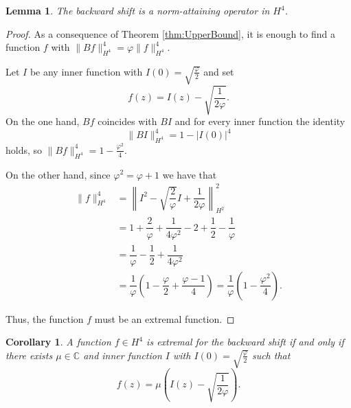 \documentclass{amsart}
\theoremstyle{plain}
\newtheorem{lemma}[theo]{Lemma}
\newtheorem{coro}[theo]{Corollary}
\theoremstyle{definition}
\newcommand{\C}{\mathbb{C}}
\begin{document}
    	\begin{lemma} \label{lem:NormAttaining}
    		The backward shift is a norm-attaining operator in $H^4$.
    	\end{lemma}
    	
    	\begin{proof}
    		As a consequence of Theorem \ref{thm:UpperBound}, it is enough to find a function $f$ with $\| Bf \|_{H^4}^4 = \varphi \| f \|_{H^4}^4$.
    		
    		Let $I$ be any inner function with $I(0) = \sqrt{\frac{\varphi}{2}}$ and set
        		\[
        		      f(z) = I (z) - \sqrt{\dfrac{1}{2\varphi}}.
        		\]
        		On the one hand, $Bf$ coincides with $B I$ and for every inner function the identity
        		\begin{equation} \label{eqn:NormInner}
        			\| B I \|_{H^4}^4 = 1 - |I(0)|^4
        		\end{equation}
        		holds, so $\| Bf \|_{H^4}^4 = 1 - \frac{\varphi^2}{4}$.
    		
    		On the other hand, since $\varphi^2 = \varphi + 1$ we have that
        		\begin{align*}
        			\| f \|_{H^4}^4 & = \left \| I^2 - \sqrt{\dfrac{2}{\varphi}} I + \dfrac{1}{2\varphi} \right \|_{H^2}^2 \\
            			&  = 1 + \dfrac{2}{\varphi} + \dfrac{1}{4 \varphi^2} - 2 + \dfrac{1}{2} - \dfrac{1}{\varphi} \\
            			& = \dfrac{1}{\varphi} -\dfrac{1}{2} + \dfrac{1}{4 \varphi^2} \\
            			& = \dfrac{1}{\varphi} \left(1 - \dfrac{\varphi}{2} + \dfrac{\varphi - 1}{4} \right) = \dfrac{1}{\varphi} \left( 1 - \dfrac{\varphi^2}{4}\right).
        		\end{align*}
    		
    		Thus, the function $f$ must be an extremal function.
    	\end{proof}
    	
    	\begin{coro}
    		A function $f \in H^4$ is extremal for the backward shift if and only if there exists $\mu \in \C$ and inner function $I$ with $I(0) = \sqrt{\frac{\varphi}{2}}$ such that
    		\[
    		      f(z) = \mu \left( I(z) - \sqrt{\dfrac{1}{2\varphi}}\right).
    		\]
    	\end{coro}
    	
\end{document}
